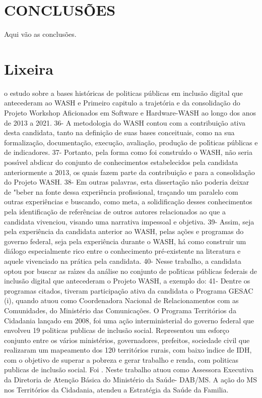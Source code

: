 \documentclass[
12pt,		%
openright,	%
twoside,  %
a4paper,			%
chapter=TITLE,		%
english,			%
french,				%
spanish,			%
brazil				%
]{USPSC-classe/USPSC}
\begin{document}
\chapter[CONCLUS\~OES]{CONCLUS\~OES}\label{CONCLUS\~OES}
Aqui v\~ao as conclus\~oes.
\chapter[Lixeira]{Lixeira}\label{Lixeira}
o estudo sobre a  bases hist\'oricas de politicas p\'ublicas em inclus\~ao digital que antecederam ao WASH e
Primeiro capitulo
a trajet\'oria e da consolida\c{c}\~ao do Projeto Workshop Aficionados em Software e Hardware-WASH ao longo dos anos de 2013 a 2021.
36- A metodologia do WASH contou com a contribui\c{c}\~ao ativa desta candidata, tanto na defini\c{c}\~ao de suas bases conceituais, como na sua formaliza\c{c}\~ao, documenta\c{c}\~ao, execu\c{c}\~ao,  avalia\c{c}\~ao, produ\c{c}\~ao de pol\'{\i}ticas p\'ublicas e de  indicadores.
37- Portanto, pela forma como foi constru\'{\i}do o WASH, n\~ao seria poss\'{\i}vel abdicar do conjunto de conhecimentos estabelecidos pela candidata anteriormente a 2013, os quais fazem parte da contribui\c{c}\~ao e  para a consolida\c{c}\~ao do Projeto WASH.  
38- Em outras palavras, esta disserta\c{c}\~ao n\~ao poderia deixar de "beber na fonte dessa experi\^encia profissional, tra\c{c}ando um paralelo com outras experi\^encias e buscando, como meta, a solidifica\c{c}\~ao desses conhecimentos pela identifica\c{c}\~ao de refer\^encias de outros autores relacionados ao que a candidata vivenciou, visando uma narrativa impessoal e objetiva.
39- Assim, seja pela experi\^encia da candidata anterior ao WASH, pelas a\c{c}\~oes e programas do governo federal,  seja pela experi\^encia durante o WASH, h\'a como construir um di\'alogo especialmente rico entre o conhecimento pr\'e-existente na literatura e aquele vivenciado na pr\'atica pela candidata.
40- Nesse trabalho, a candidata optou por buscar as ra\'{\i}zes da an\'alise no conjunto de pol\'{\i}ticas p\'ublicas federais  de inclus\~ao digital que antecederam o Projeto WASH, a exemplo do:
41- Dentre os  programas citados, tiveram participa\c{c}\~ao ativa da candidata o Programa GESAC (i), quando atuou como Coordenadora  Nacional de Relacionamentos com as Comunidades, do Minist\'erio das Comunica\c{c}\~oes. O Programa Territ\'orios da Cidadania lan\c{c}ado em 2008, foi  uma a\c{c}\~ao interministerial do governo federal que envolveu 19 politicas publicas de inclus\~ao social. Representou um esfor\c{c}o conjunto entre os v\'arios minist\'erios, governadores, prefeitos, sociedade civil que realizaram um mapeamento dos 120   territ\'orios rurais, com baixo \'{\i}ndice de IDH, com o objetivo de superar a pobreza e gerar trabalho e renda, com politicas publicas de inclus\~ao social. Foi . Neste  trabalho atuou como Assessora Executiva da Diretoria de Aten\c{c}\~ao B\'asica do Minist\'erio da Sa\'ude- DAB/MS. A a\c{c}\~ao do MS nos Territ\'orios da Cidadania, atendeu  a Estrat\'egia da Sa\'ude da Familia.  
\end{document}
